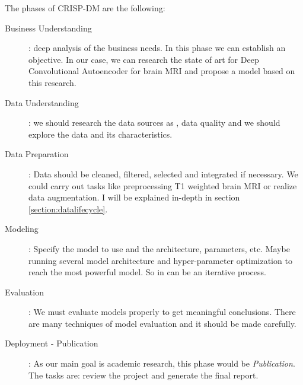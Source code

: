 The phases of CRISP-DM \cite{crisp} are the following:
\begin{description}
    \item[Business Understanding]: deep analysis of the business needs. In this phase we can establish an objective. In our case, we can research the state of art for Deep Convolutional Autoencoder for brain MRI and propose a model based on this research.
    \item[Data Understanding]: we should research the data sources as  , data quality and we should explore the data and its characteristics.
    \item[Data Preparation]: Data should be cleaned, filtered, selected and integrated if necessary. We could carry out tasks like preprocessing T1 weighted brain MRI or realize data augmentation. I will be explained in-depth in section \ref{section:datalifecycle}.
    \item[Modeling]: Specify the model to use and the architecture, parameters, etc. Maybe running several model architecture and hyper-parameter optimization to reach the most powerful model. So in can be an iterative process.
    \item[Evaluation]: We must evaluate models properly to get meaningful conclusions. There are many techniques of model evaluation and it should be made carefully.
    \item[Deployment - Publication]: As our main goal is academic research, this phase would be \textit{Publication}. The tasks are: review the project and generate the final report.
\end{description}